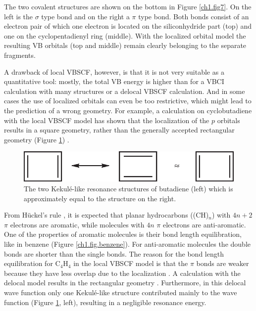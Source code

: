 The two covalent structures are shown on the bottom in Figure \ref{ch1.fig7}. On the left is the $\sigma$ type bond and on the right a $\pi$ type bond. Both bonds consist of an electron pair of which one electron is located on the siliconhydride part (top) and one on the cyclopentadienyl ring (middle). With the localized orbital model the resulting VB orbitals (top and middle) remain clearly belonging to the separate fragments. 

A drawback of local VBSCF, however, is that it is not very suitable as a quantitative tool: mostly, the total VB energy is higher than for a VBCI calculation with many structures or a delocal VBSCF calculation. And in some cases the use of localized orbitals can even be too restrictive, which might lead to the prediction of a wrong geometry. For example, a calculation on cyclobutadiene with the local VBSCF model \cite{cyclobutt} has shown that the localization of the $p$ orbitals results in a square geometry, rather than the generally accepted rectangular geometry (Figure \ref{ch1.fig.butadiene}) \cite{arnold}. 
\begin{figure}[htdp]
\center
\includegraphics{introduction/figures/butadiene.eps}
\caption{The two Kekul\'e-like resonance structures of butadiene (left) which is approximately equal to the structure on the right.}
\label{ch1.fig.butadiene}
\end{figure}
From H\"{u}ckel's rule \cite{huckel2,huckel4}, it is expected that planar hydrocarbons ((CH)$_n$) with $4n+2$ $\pi$ electrons are aromatic, while molecules with $4n$ $\pi$ electrons are anti-aromatic. One of the properties of aromatic molecules is their bond length equilibration, like in benzene (Figure \ref{ch1.fig.benzene}). For anti-aromatic molecules the double bonds are shorter than the single bonds. The reason for the bond length equilibration for C$_4$H$_4$ in the local VBSCF model is that the $\pi$ bonds are weaker because they have less overlap due to the localization \cite{cyclobutt}. A calculation with the delocal model results in the rectangular geometry \cite{cyclobutt}. Furthermore, in this delocal wave function only one Kekul\'{e}-like structure contributed mainly to the wave function (Figure \ref{ch1.fig.butadiene}, left), resulting in a negligible resonance energy.

